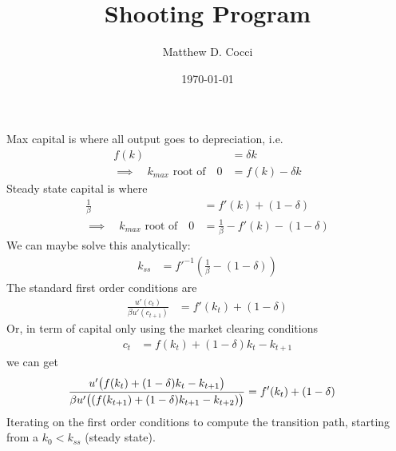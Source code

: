 \documentclass[12pt]{article}
\author{Matthew D. Cocci}
\title{Shooting Program}
\date{\today}
\theoremstyle{plain}
\theoremstyle{definition}
\theoremstyle{remark}
\begin{document}
\maketitle


Max capital is where all output goes to depreciation, i.e.
\begin{align*}
  f(k) &= \delta k \\
  \implies\quad
  \text{$k_{max}$ root of}\quad
  0 &= f(k) - \delta k
\end{align*}
Steady state capital is where
\begin{align*}
  \frac{1}{\beta}
  &= f'(k) + (1-\delta) \\
  \implies\quad
  \text{$k_{max}$ root of}\quad
  0 &= \frac{1}{\beta} - f'(k) - (1-\delta)
\end{align*}
We can maybe solve this analytically:
\begin{align*}
  k_{ss} &=
  f'^{-1}\left(\frac{1}{\beta} - (1-\delta)\right)
\end{align*}
The standard first order conditions are
\begin{align*}
  \frac{u'(c_t)}{\beta u'(c_{t+1})}
  &= f'(k_t) + (1-\delta)
\end{align*}
Or, in term of capital only using the market clearing conditions
\begin{align*}
  c_t &=
  f(k_t) + (1-\delta)k_t - k_{t+1}
\end{align*}
we can get
\begin{align*}
  \frac{u'\big(f(k_t) + (1-\delta)k_t - k_{t+1}\big)}{%
    \beta u'\big((f(k_{t+1}) + (1-\delta)k_{t+1} - k_{t+2})\big)}
  &= f'(k_t) + (1-\delta)
\end{align*}
\clearpage
Iterating on the first order conditions to compute the transition path,
starting from a $k_0<k_{ss}$ (steady state).
\end{document}
